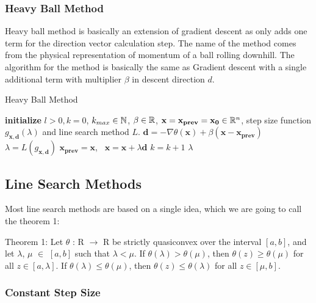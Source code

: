 \documentclass[a4paper,english,titlepage,12pt]{article}
\newcommand{\vect}[1]{\ensuremath{\mathbf{#1}}}
\newcommand{\norm}[1]{\ensuremath\Vert #1 \Vert}
\newcommand{\R}{\ensuremath\mathbb{R}}
\newcommand{\N}{\ensuremath\mathbb{N}}
\begin{document}
\subsubsection{Heavy Ball Method}


Heavy ball method is basically an extension of gradient descent as only adds one term for the direction vector calculation step. The name of the method comes from the  physical representation of momentum of a ball rolling downhill. The algorithm for the method is basically the same as Gradient descent with a single additional term with multiplier $\beta$ in descent direction $d$.

\begin{algorithm}[H]
\caption{Heavy Ball Method}
\label{alg_heavy_ball}
\begin{algorithmic}[1]
\STATE \textbf{initialize} $l > 0, k = 0$, $k_{max} \in \N$, $\beta \in \R$, $\vect{x} = \vect{x_{prev}} = \vect{x_0} \in \R^n$, step size function $g_{\vect{x}, \vect{d}}(\lambda)$ and line search method $L$.
\WHILE{$\norm{\nabla \theta(\vect{x})} > l$ \AND $k < k_{max}$}
    \STATE $\vect{d} = -\nabla \theta(\vect{x}) + \beta (\vect{x} - \vect{x_{prev}})$
    \STATE $\lambda = L(g_{\vect{x}, \vect{d}})$
    \STATE $\vect{x_{prev}} = \vect{x}$, \ $\vect{x} = \vect{x} + \lambda \vect{d}$
    \STATE $k = k + 1$
\ENDWHILE
\RETURN $\lambda$
\end{algorithmic}
\end{algorithm}


\subsection{Line Search Methods}


Most line search methods are based on a single idea, which we are going to call the theorem 1:

Theorem 1: Let $\theta$ : R $\rightarrow$ R be strictly quasiconvex over the interval $[a, b]$, and let $\lambda$, $\mu$ $\in$ $[a, b]$ such that $\lambda < \mu$. If $\theta(\lambda) > \theta(\mu)$, then $\theta(z) \geq \theta(\mu)$
for all $z \in [a, \lambda]$. If $\theta(\lambda) \leq \theta(\mu)$, then $\theta(z) \leq \theta(\lambda)$ for all $z \in [\mu, b]$. \cite{course_material_nonlinear_optimisation}


\subsubsection{Constant Step Size}
\end{document}
